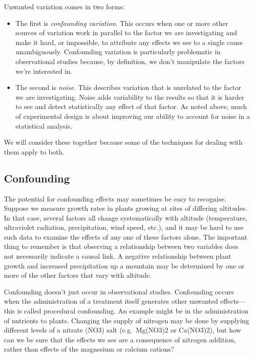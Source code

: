 \documentclass[
]{book}
\providecommand{\tightlist}{%
  \setlength{\itemsep}{0pt}\setlength{\parskip}{0pt}}
\begin{document}
Unwanted variation comes in two forms:

\begin{itemize}
\tightlist
\item
  The first is \emph{confounding variation}. This occurs when one or more other sources of variation work in parallel to the factor we are investigating and make it hard, or impossible, to attribute any effects we see to a single cause unambiguously. Confounding variation is particularly problematic in observational studies because, by definition, we don't manipulate the factors we're interested in.
\item
  The second is \emph{noise}. This describes variation that is unrelated to the factor we are investigating. Noise adds variability to the results so that it is harder to see and detect statistically any effect of that factor. As noted above, much of experimental design is about improving our ability to account for noise in a statistical analysis.
\end{itemize}

We will consider these together because some of the techniques for dealing with them apply to both.

\hypertarget{confounding}{%
\subsection{Confounding}\label{confounding}}

The potential for confounding effects may sometimes be easy to recognise. Suppose we measure growth rates in plants growing at sites of differing altitudes. In that case, several factors all change systematically with altitude (temperature, ultraviolet radiation, precipitation, wind speed, etc.), and it may be hard to use such data to examine the effects of any one of these factors alone. The important thing to remember is that observing a relationship between two variables does not necessarily indicate a causal link. A negative relationship between plant growth and increased precipitation up a mountain may be determined by one or more of the other factors that vary with altitude.

Confounding doesn't just occur in observational studies. Confounding occurs when the administration of a treatment itself generates other unwanted effects---this is called procedural confounding. An example might be in the administration of nutrients to plants. Changing the supply of nitrogen may be done by supplying different levels of a nitrate (NO3) salt (e.g.~Mg(NO3)2 or Ca(NO3)2), but how can we be sure that the effects we see are a consequence of nitrogen addition, rather than effects of the magnesium or calcium cations?
\end{document}

